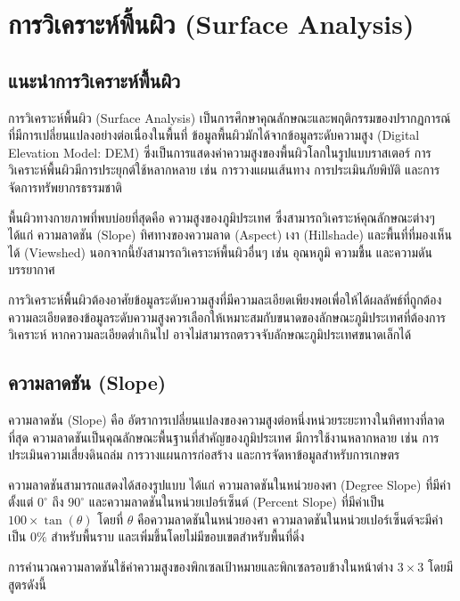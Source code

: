 \section{การวิเคราะห์พื้นผิว (Surface Analysis)}

\subsection{แนะนำการวิเคราะห์พื้นผิว}
การวิเคราะห์พื้นผิว (Surface Analysis) เป็นการศึกษาคุณลักษณะและพฤติกรรมของปรากฏการณ์ที่มีการเปลี่ยนแปลงอย่างต่อเนื่องในพื้นที่ ข้อมูลพื้นผิวมักได้จากข้อมูลระดับความสูง (Digital Elevation Model: DEM) ซึ่งเป็นการแสดงค่าความสูงของพื้นผิวโลกในรูปแบบราสเตอร์ การวิเคราะห์พื้นผิวมีการประยุกต์ใช้หลากหลาย เช่น การวางแผนเส้นทาง การประเมินภัยพิบัติ และการจัดการทรัพยากรธรรมชาติ

พื้นผิวทางกายภาพที่พบบ่อยที่สุดคือ ความสูงของภูมิประเทศ ซึ่งสามารถวิเคราะห์คุณลักษณะต่างๆ ได้แก่ ความลาดชัน (Slope) ทิศทางของความลาด (Aspect) เงา (Hillshade) และพื้นที่ที่มองเห็นได้ (Viewshed) นอกจากนี้ยังสามารถวิเคราะห์พื้นผิวอื่นๆ เช่น อุณหภูมิ ความชื้น และความดันบรรยากาศ

การวิเคราะห์พื้นผิวต้องอาศัยข้อมูลระดับความสูงที่มีความละเอียดเพียงพอเพื่อให้ได้ผลลัพธ์ที่ถูกต้อง ความละเอียดของข้อมูลระดับความสูงควรเลือกให้เหมาะสมกับขนาดของลักษณะภูมิประเทศที่ต้องการวิเคราะห์ หากความละเอียดต่ำเกินไป อาจไม่สามารถตรวจจับลักษณะภูมิประเทศขนาดเล็กได้

\subsection{ความลาดชัน (Slope)}

ความลาดชัน (Slope) คือ อัตราการเปลี่ยนแปลงของความสูงต่อหนึ่งหน่วยระยะทางในทิศทางที่ลาดที่สุด ความลาดชันเป็นคุณลักษณะพื้นฐานที่สำคัญของภูมิประเทศ มีการใช้งานหลากหลาย เช่น การประเมินความเสี่ยงดินถล่ม การวางแผนการก่อสร้าง และการจัดหาข้อมูลสำหรับการเกษตร

ความลาดชันสามารถแสดงได้สองรูปแบบ ได้แก่ ความลาดชันในหน่วยองศา (Degree Slope) ที่มีค่าตั้งแต่ $0^\circ$ ถึง $90^\circ$ และความลาดชันในหน่วยเปอร์เซ็นต์ (Percent Slope) ที่มีค่าเป็น $100 \times \tan(\theta)$ โดยที่ $\theta$ คือความลาดชันในหน่วยองศา ความลาดชันในหน่วยเปอร์เซ็นต์จะมีค่าเป็น $0\%$ สำหรับพื้นราบ และเพิ่มขึ้นโดยไม่มีขอบเขตสำหรับพื้นที่ดิ่ง

การคำนวณความลาดชันใช้ค่าความสูงของพิกเซลเป้าหมายและพิกเซลรอบข้างในหน้าต่าง $3 \times 3$ โดยมีสูตรดังนี้

